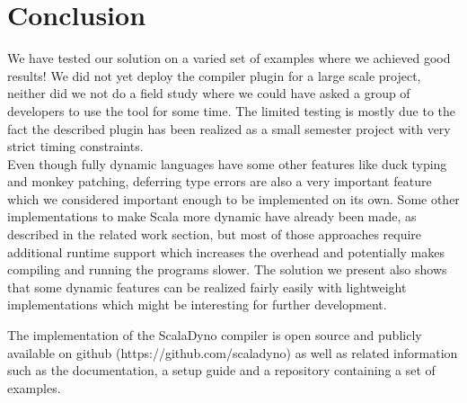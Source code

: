 \section{Conclusion}
We have tested our solution on a varied set of examples where we achieved good results! We did not yet deploy the compiler plugin for a large scale project, neither did we not do a field study where we could have asked a group of developers to use the tool for some time. The limited testing is mostly due to the fact the described plugin has been realized as a small semester project with very strict timing constraints.
\\
Even though fully dynamic languages have some other features like duck typing and monkey patching, deferring type errors are also a very important feature which we considered important enough to be implemented on its own. Some other implementations to make Scala more dynamic have already been made, as described in the related work section, but most of those approaches require additional runtime support which increases the overhead and potentially makes compiling and running the programs slower. The solution we present also shows that some dynamic features can be realized fairly easily with lightweight implementations which might be interesting for further development.

The implementation of the ScalaDyno compiler is open source and publicly available on github (https://github.com/scaladyno) as well as related information such as the documentation, a setup guide and a repository containing a set of examples.